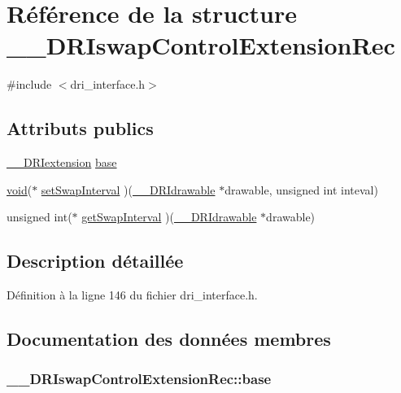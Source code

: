 \hypertarget{struct_____d_r_iswap_control_extension_rec}{\section{Référence de la structure \-\_\-\-\_\-\-D\-R\-Iswap\-Control\-Extension\-Rec}
\label{struct_____d_r_iswap_control_extension_rec}
}


{\ttfamily \#include $<$dri\-\_\-interface.\-h$>$}

\subsection*{Attributs publics}
\begin{DoxyCompactItemize}
\item 
\hyperlink{dri__interface_8h_a4e0a61c8ece00d2b2c6792a9a1b55385}{\-\_\-\-\_\-\-D\-R\-Iextension} \hyperlink{struct_____d_r_iswap_control_extension_rec_a63e0317da77ea34096da910ec41c8291}{base}
\item 
\hyperlink{glu_8h_a4292190e3f1f6b373a760c7d9316ad3c}{void}($\ast$ \hyperlink{struct_____d_r_iswap_control_extension_rec_a31f1e571fcbb13be8720ad03645ecaa0}{set\-Swap\-Interval} )(\hyperlink{dri__interface_8h_a5bfb832a0a08208d95b3bbef439d2262}{\-\_\-\-\_\-\-D\-R\-Idrawable} $\ast$drawable, unsigned int inteval)
\item 
unsigned int($\ast$ \hyperlink{struct_____d_r_iswap_control_extension_rec_a10c8d65ba5f6416c2f5b015d5cedd143}{get\-Swap\-Interval} )(\hyperlink{dri__interface_8h_a5bfb832a0a08208d95b3bbef439d2262}{\-\_\-\-\_\-\-D\-R\-Idrawable} $\ast$drawable)
\end{DoxyCompactItemize}


\subsection{Description détaillée}


Définition à la ligne 146 du fichier dri\-\_\-interface.\-h.



\subsection{Documentation des données membres}
\hypertarget{struct_____d_r_iswap_control_extension_rec_a63e0317da77ea34096da910ec41c8291}{
\subsubsection[{base}]{ \-\_\-\-\_\-\-D\-R\-Iswap\-Control\-Extension\-Rec\-::base}}\label{struct_____d_r_iswap_control_extension_rec_a63e0317da77ea34096da910ec41c8291}


